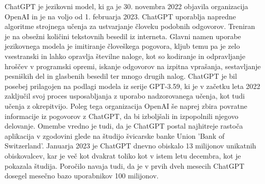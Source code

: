 \documentclass[12pt,a4paper]{book}
\begin{document}
ChatGPT je jezikovni model, ki ga je 30. novembra 2022 objavila organizacija OpenAI in je na voljo od 1. februarja 2023. \cite{openai_codex}
ChatGPT uporablja napredne algoritme strojnega učenja za ustvarjanje človeku podobnih odgovorov. Treniran je na obsežni količini tekstovnih besedil iz interneta. Glavni namen uporabe jezikovnega modela je imitiranje človeškega pogovora, kljub temu pa je zelo vsestranski in lahko opravlja številne naloge, kot so kodiranje in odpravljanje hroščev v programski opremi, iskanje odgovorov na izpitna
vprašanja, sestavljanje pesniških del in glasbenih besedil ter mnogo drugih nalog. ChatGPT je bil posebej prilagojen na podlagi modela iz serije GPT-3.59, ki je v začetku leta 2022 zaključil svoj proces usposabljanja z uporabo nadzorovanega učenja, kot tudi učenja z okrepitvijo. Poleg tega organizacija OpenAI še naprej zbira povratne informacije iz pogovorov z ChatGPT, da bi izboljšali in izpopolnili njegovo delovanje.
Omembe vredno je tudi, da je ChatGPT postal najhitreje rastoča aplikacija v zgodovini
glede na študijo švicarske banke Union 'Bank of Switzerland'. Januarja 2023 je ChatGPT dnevno obiskalo 13 milijonov unikatnih obiskovalcev, kar je več kot dvakrat toliko kot v istem letu decembra, kot je pokazala študija. Poročilo navaja tudi, da je v prvih dveh mesecih ChatGPT dosegel mesečno bazo uporabnikov 100 milijonov. \cite{yetistiren2023evaluating}
\end{document}
